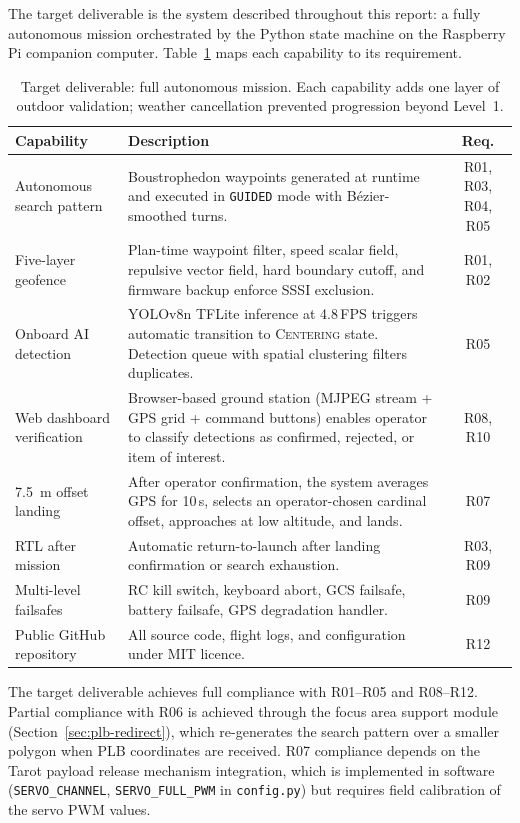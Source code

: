 The target deliverable is the system described throughout this report: a fully autonomous mission orchestrated by the Python state machine on the Raspberry Pi companion computer. Table~\ref{tab:target} maps each capability to its requirement.

\begin{table}[htbp]
  \centering\small
  \caption{Target deliverable: full autonomous mission.  Each capability adds one layer of outdoor validation; weather cancellation prevented progression beyond Level~1.}\label{tab:target}
  \begin{tabularx}{\linewidth}{@{}p{4.2cm}X c@{}}
    \toprule
    \textbf{Capability} & \textbf{Description} & \textbf{Req.} \\
    \midrule
    Autonomous search pattern & Boustrophedon waypoints generated at runtime and executed in \texttt{GUIDED} mode with B\'{e}zier-smoothed turns. & R01, R03, R04, R05 \\
    Five-layer geofence & Plan-time waypoint filter, speed scalar field, repulsive vector field, hard boundary cutoff, and firmware backup enforce SSSI exclusion. & R01, R02 \\
    Onboard AI detection & YOLOv8n TFLite inference at 4.8\,FPS triggers automatic transition to \textsc{Centering} state. Detection queue with spatial clustering filters duplicates. & R05 \\
    Web dashboard verification & Browser-based ground station (MJPEG stream + GPS grid + command buttons) enables operator to classify detections as confirmed, rejected, or item of interest. & R08, R10 \\
    \SI{7.5}{\metre} offset landing & After operator confirmation, the system averages GPS for 10\,s, selects an operator-chosen cardinal offset, approaches at low altitude, and lands. & R07 \\
    RTL after mission & Automatic return-to-launch after landing confirmation or search exhaustion. & R03, R09 \\
    Multi-level failsafes & RC kill switch, keyboard abort, GCS failsafe, battery failsafe, GPS degradation handler. & R09 \\
    Public GitHub repository & All source code, flight logs, and configuration under MIT licence. & R12 \\
    \bottomrule
  \end{tabularx}
\end{table}

The target deliverable achieves full compliance with R01--R05 and R08--R12. Partial compliance with R06 is achieved through the focus area support module (Section~\ref{sec:plb-redirect}), which re-generates the search pattern over a smaller polygon when PLB coordinates are received. R07 compliance depends on the Tarot payload release mechanism integration, which is implemented in software (\texttt{SERVO\_CHANNEL}, \texttt{SERVO\_FULL\_PWM} in \texttt{config.py}) but requires field calibration of the servo PWM values.

